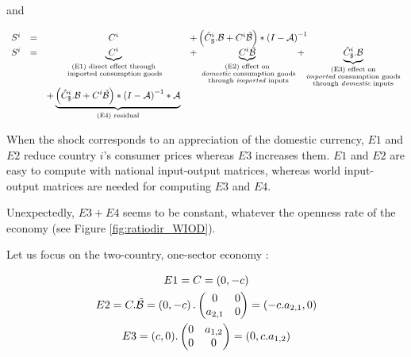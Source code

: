 \documentclass[11pt,a4paper]{article}
\begin{document}
and

\begin{equation}
\begin{array}{lccl}
S^ i&=&C^i	&+ \left(\hat{C}^i_\$.{\cal B}+{C^i}{\tilde{{\cal B}}}\right)*{{(I-{\cal A})}^{-1}} \\
S^i &=&\underbrace{C^i}_{\substack{\text{(E1) direct effect through} \\ \text{ imported consumption goods}}}&+ \underbrace{{C^i}{\tilde{{\cal B}}}}_{\substack{\text{(E2) effect on} \\ \text{ \emph{domestic} consumption goods} \\ \text{ through \emph{imported} inputs}}}  + \underbrace{\hat{C}^i_\$.{\cal B}}_{\substack{\text{(E3)  effect on} \\ \text{\emph{imported} consumption goods} \\ \text{through \emph{domestic} inputs}}} \\ &&+\underbrace {\left( \hat{C}^i_\$.{\cal B} + {C^i}{\tilde{{\cal B}}}\right)*{{(I-{\cal A})}^{-1}}*{\cal A}}_{\text{(E4) residual}} \\
\end{array}
\end{equation}



When the shock corresponds to an appreciation of the domestic currency, $E1$ and $E2$ reduce country $i$'s consumer prices whereas $E3$ increases them. $E1$ and $E2$ are easy to compute with national input-output matrices, whereas world input-output matrices are needed for computing $E3$ and $E4$.

Unexpectedly, $E3 + E4$ seems to be constant, whatever the openness rate of the economy (see Figure \ref{fig:ratiodir_WIOD}).


Let us focus on the two-country, one-sector economy : 

\begin{gather*}
E1=C=\left(0,-c\right)
\\
E2=C.\tilde{\cal B}=\left(0,-c\right).\left(\begin{matrix}0&0\\a_{2,1}&0\end{matrix}\right)=\left(-c.a_{2,1},0\right)
\\
E3=(c,0).\left(\begin{matrix}0&a_{1,2}\\0&0\end{matrix}\right)=\left(0,c.a_{1,2}\right)
\end{gather*}
\end{document}
